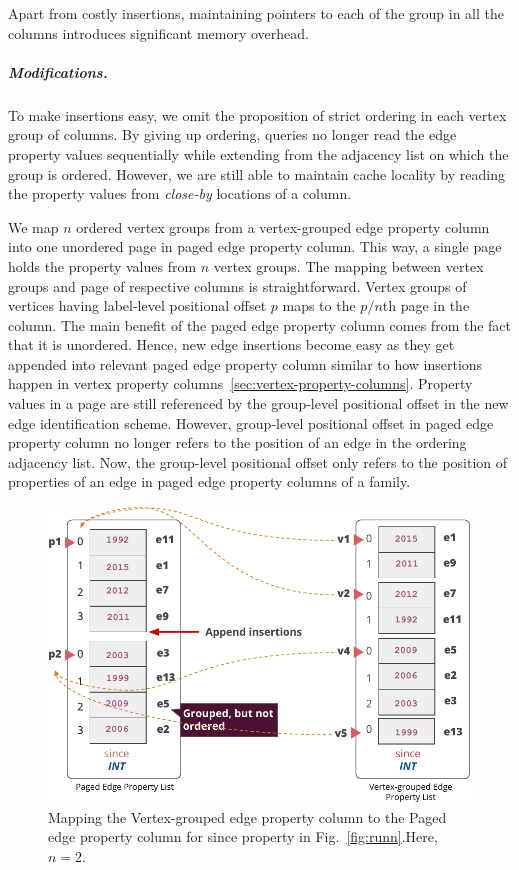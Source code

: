Apart from costly insertions, maintaining pointers to each of the group in all the columns introduces significant memory overhead. 

\vspace{-16pt}
\subparagraph{Modifications.}
To make insertions easy, we omit the proposition of strict ordering in each vertex group of columns. By giving up ordering, queries no longer read the edge property values sequentially while extending from the adjacency list on which the group is ordered. However, we are still able to maintain cache locality by reading the property values from \emph{close-by} locations of a column.

We map $n$ ordered vertex groups from a vertex-grouped edge property column into one unordered page in paged edge property column. This way, a single page holds the property values from $n$ vertex groups. The mapping between vertex groups and page of respective columns is straightforward. Vertex groups of vertices having label-level positional offset $p$ maps to the $p/n$th page in the column. The main benefit of the paged edge property column comes from the fact that it is unordered. Hence, new edge insertions become easy as they get appended into relevant paged edge property column similar to how insertions happen in vertex property columns~\ref{sec:vertex-property-columns}. Property values in a page are still referenced by the group-level positional offset in the new edge identification scheme. However, group-level positional offset in paged edge property column no longer refers to the position of an edge in the ordering adjacency list. Now, the group-level positional offset only refers to the position of properties of an edge in paged edge property columns of a family. 

\begin{figure}
	\vspace{-40pt}
	\hfill\includegraphics[scale=0.78]{img/paged}\hspace*{\fill}
	\captionsetup{justification=centering}
	\caption{Mapping the Vertex-grouped edge property column to the Paged edge property column for since property in Fig.~\ref{fig:runn}.Here, $n=2$.}
	\label{fig:paged}
	\vspace{-5pt}
\end{figure}


